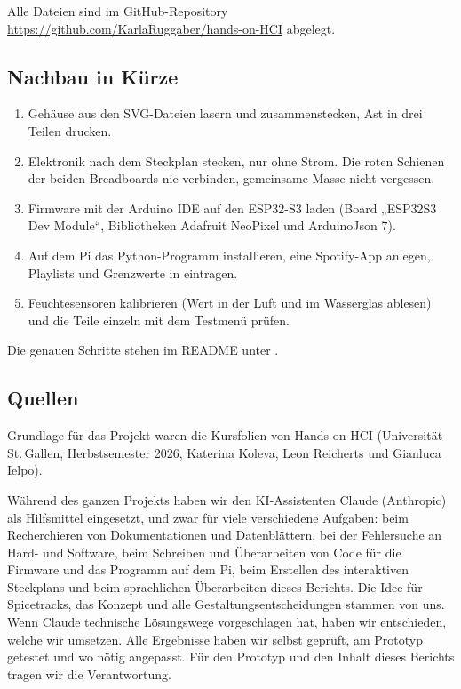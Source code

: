 \documentclass[11pt,a4paper]{article}
\begin{document}
Alle Dateien sind im GitHub-Repository \url{https://github.com/KarlaRuggaber/hands-on-HCI} abgelegt.

\subsection{Nachbau in Kürze}

\begin{enumerate}[itemsep=2pt]
  \item Gehäuse aus den SVG-Dateien lasern und zusammenstecken, Ast in drei Teilen drucken.
  \item Elektronik nach dem Steckplan stecken, nur ohne Strom. Die roten Schienen der beiden Breadboards nie verbinden, gemeinsame Masse nicht vergessen.
  \item Firmware mit der Arduino IDE auf den ESP32-S3 laden (Board „ESP32S3 Dev Module“, Bibliotheken Adafruit NeoPixel und ArduinoJson 7).
  \item Auf dem Pi das Python-Programm installieren, eine Spotify-App anlegen, Playlists und Grenzwerte in  eintragen.
  \item Feuchtesensoren kalibrieren (Wert in der Luft und im Wasserglas ablesen) und die Teile einzeln mit dem Testmenü prüfen.
\end{enumerate}

Die genauen Schritte stehen im README unter .

\subsection{Quellen}

Grundlage für das Projekt waren die Kursfolien von Hands-on HCI (Universität St.\,Gallen, Herbstsemester 2026, Katerina Koleva, Leon Reicherts und Gianluca Ielpo).

Während des ganzen Projekts haben wir den KI-Assistenten Claude (Anthropic) als Hilfsmittel eingesetzt, und zwar für viele verschiedene Aufgaben: beim Recherchieren von Dokumentationen und Datenblättern, bei der Fehlersuche an Hard- und Software, beim Schreiben und Überarbeiten von Code für die Firmware und das Programm auf dem Pi, beim Erstellen des interaktiven Steckplans und beim sprachlichen Überarbeiten dieses Berichts. Die Idee für Spicetracks, das Konzept und alle Gestaltungsentscheidungen stammen von uns. Wenn Claude technische Lösungswege vorgeschlagen hat, haben wir entschieden, welche wir umsetzen. Alle Ergebnisse haben wir selbst geprüft, am Prototyp getestet und wo nötig angepasst. Für den Prototyp und den Inhalt dieses Berichts tragen wir die Verantwortung.
\end{document}
